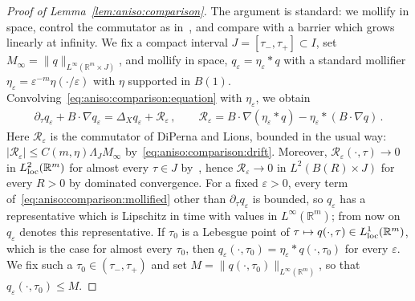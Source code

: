 \documentclass[11pt,reqno]{amsproc}
\numberwithin{equation}{section}
\theoremstyle{remark}
\newcommand{\p}{\partial}
\newcommand{\RR}{\mathbb R}
\newcommand{\eps}{\varepsilon}
\begin{document}
\begin{proof}[Proof of Lemma~\ref{lem:aniso:comparison}]
The argument is standard: we mollify in space, control the commutator as in~\cite{DiPernaLions89}, and compare with a barrier which grows linearly at infinity. 
We fix a compact interval $J=[\tau_-,\tau_+]\subset I$, set $M_\infty=\|q\|_{L^\infty(\RR^m\times J)}$, and mollify in space, $q_\eps=\eta_\eps*q$ with a standard mollifier $\eta_\eps=\eps^{-m}\eta(\cdot/\eps)$ with $\eta$ supported in $B(1)$. Convolving~\eqref{eq:aniso:comparison:equation} with $\eta_\eps$, we obtain
\begin{align}
\p_\tau q_\eps+B\cdot\nabla q_\eps
=\Delta_Xq_\eps+\mathcal R_\eps
\,,\qquad
\mathcal R_\eps=B\cdot\nabla(\eta_\eps*q)-\eta_\eps*(B\cdot\nabla q)
\,.
\label{eq:aniso:comparison:mollified}
\end{align}
Here $\mathcal R_\eps$ is the commutator of DiPerna and Lions, bounded in the usual way: $|\mathcal R_\eps|\le C(m,\eta)\Lambda_JM_\infty$ by~\eqref{eq:aniso:comparison:drift}. Moreover, $\mathcal R_\eps(\cdot,\tau)\to0$ in $L^2_{\rm loc}(\RR^m)$ for almost every $\tau\in J$ by~\cite[Lemma~II.1]{DiPernaLions89}, hence $\mathcal R_\eps\to0$ in $L^2(B(R)\times J)$ for every $R>0$ by dominated convergence. For a fixed $\eps>0$, every term of~\eqref{eq:aniso:comparison:mollified} other than $\p_\tau q_\eps$ is bounded, so $q_\eps$ has a representative which is Lipschitz in time with values in $L^\infty(\RR^m)$; from now on $q_\eps$ denotes this representative. If $\tau_0$ is a Lebesgue point of $\tau\mapsto q(\cdot,\tau)\in L^1_{\rm loc}(\RR^m)$, which is the case for almost every $\tau_0$, then $q_\eps(\cdot,\tau_0)=\eta_\eps*q(\cdot,\tau_0)$ for every $\eps$. We fix such a $\tau_0\in(\tau_-,\tau_+)$ and set $M=\|q(\cdot,\tau_0)\|_{L^\infty(\RR^m)}$, so that $q_\eps(\cdot,\tau_0)\le M$.


\end{proof}
\end{document}
